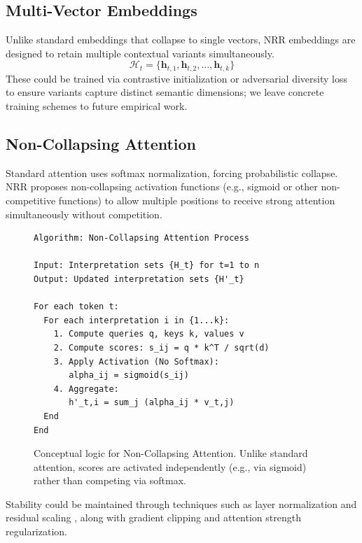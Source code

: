 \documentclass[11pt,a4paper]{article}
\begin{document}
\subsection{Multi-Vector Embeddings}

Unlike standard embeddings that collapse to single vectors, NRR embeddings are designed to retain multiple contextual variants simultaneously.
\begin{equation}
\mathcal{H}_t = \{\mathbf{h}_{t,1}, \mathbf{h}_{t,2}, \ldots, \mathbf{h}_{t,k}\}
\end{equation}
These could be trained via contrastive initialization or adversarial diversity loss to ensure variants capture distinct semantic dimensions; we leave concrete training schemes to future empirical work.

\subsection{Non-Collapsing Attention}

Standard attention uses softmax normalization, forcing probabilistic collapse.
NRR proposes non-collapsing activation functions (e.g., sigmoid or other non-competitive functions) to allow multiple positions to receive strong attention simultaneously without competition.

\begin{figure}[ht]
\centering
\begin{verbatim}
Algorithm: Non-Collapsing Attention Process

Input: Interpretation sets {H_t} for t=1 to n
Output: Updated interpretation sets {H'_t}

For each token t:
  For each interpretation i in {1...k}:
    1. Compute queries q, keys k, values v
    2. Compute scores: s_ij = q * k^T / sqrt(d)
    3. Apply Activation (No Softmax):
       alpha_ij = sigmoid(s_ij)
    4. Aggregate:
       h'_t,i = sum_j (alpha_ij * v_t,j)
  End
End
\end{verbatim}
\caption{Conceptual logic for Non-Collapsing Attention.
Unlike standard attention, scores are activated independently (e.g., via sigmoid) rather than competing via softmax.}
\label{fig:attention_logic}
\end{figure}

Stability could be maintained through techniques such as layer normalization \cite{ba2016layer} and residual scaling \cite{bachlechner2020rezero}, along with gradient clipping and attention strength regularization.
\end{document}

